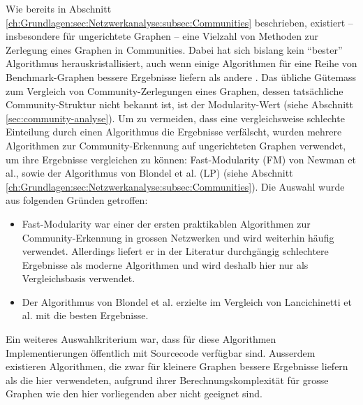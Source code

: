 Wie bereits in Abschnitt
\ref{ch:Grundlagen:sec:Netzwerkanalyse:subsec:Communities}
beschrieben, existiert -- insbesondere f\"ur ungerichtete Graphen --
eine Vielzahl von Methoden zur Zerlegung eines Graphen in
Communities. Dabei hat sich bislang kein ``bester'' Algorithmus
herauskristallisiert, auch wenn einige Algorithmen f\"ur eine Reihe
von Benchmark-Graphen bessere Ergebnisse liefern als andere
\cite{Lancichinetti2009}. Das \"ubliche G\"utemass zum Vergleich von
Community-Zerlegungen eines Graphen, dessen tats\"achliche
Community-Struktur nicht bekannt ist, ist der Modularity-Wert (siehe
Abschnitt \ref{sec:community-analyse}).  Um zu vermeiden, dass eine
vergleichsweise schlechte Einteilung durch einen Algorithmus die
Ergebnisse verf\"alscht, wurden mehrere Algorithmen zur
Community-Erkennung auf ungerichteten Graphen verwendet, um ihre
Ergebnisse vergleichen zu k\"onnen: Fast-Modularity (FM) von Newman et
al., sowie der Algorithmus von Blondel et al. (LP) (siehe Abschnitt
\ref{ch:Grundlagen:sec:Netzwerkanalyse:subsec:Communities}). Die
Auswahl wurde aus folgenden Gr\"unden getroffen:

\begin{itemize}
\item Fast-Modularity war einer der ersten praktikablen Algorithmen
  zur Community-Erkennung in grossen Netzwerken und wird weiterhin
  h\"aufig verwendet. Allerdings liefert er in der Literatur
  durchg\"angig schlechtere Ergebnisse als moderne Algorithmen
  \cite{Fortunato2010} und wird deshalb hier nur als Vergleichsbasis
  verwendet.
\item Der Algorithmus von Blondel et al. erzielte im Vergleich von
  Lancichinetti et al. \cite{Lancichinetti2009} mit die besten Ergebnisse.
\end{itemize}

Ein weiteres Auswahlkriterium war, dass f\"ur diese Algorithmen
Implementierungen \"offentlich mit Sourcecode verf\"ugbar
sind. Ausserdem existieren Algorithmen, die zwar f\"ur kleinere
Graphen bessere Ergebnisse liefern als die hier verwendeten, aufgrund
ihrer Berechnungskomplexit\"at f\"ur grosse Graphen wie den hier
vorliegenden aber nicht geeignet sind.


